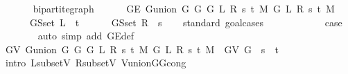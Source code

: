 \begin{isabellebody}
\ \ \isamarkupfalse%
\isanewline
\ \ \ \ {\isachardoublequoteopen}bipartite{\isacharunderscore}{\kern0pt}graph\isanewline
\ \ \ \ \ \ {\isacharparenleft}{\kern0pt}G{\isachardot}{\kern0pt}E\ {\isacharparenleft}{\kern0pt}G{\isachardot}{\kern0pt}union\ {\isacharparenleft}{\kern0pt}G{}\ G\ {\isacharparenleft}{\kern0pt}G{}\ L\ R\ s\ t\ M{\isacharparenright}{\kern0pt}{\isacharparenright}{\kern0pt}\ {\isacharparenleft}{\kern0pt}G{}\ L\ R\ s\ t\ M{\isacharparenright}{\kern0pt}{\isacharparenright}{\kern0pt}{\isacharparenright}{\kern0pt}\isanewline
\ \ \ \ \ \ {\isacharparenleft}{\kern0pt}G{\isachardot}{\kern0pt}S{\isachardot}{\kern0pt}set\ L\ {\isasymunion}\ {\isacharbraceleft}{\kern0pt}t{\isacharbraceright}{\kern0pt}{\isacharparenright}{\kern0pt}\isanewline
\ \ \ \ \ \ {\isacharparenleft}{\kern0pt}G{\isachardot}{\kern0pt}S{\isachardot}{\kern0pt}set\ R\ {\isasymunion}\ {\isacharbraceleft}{\kern0pt}s{\isacharbraceright}{\kern0pt}{\isacharparenright}{\kern0pt}{\isachardoublequoteclose}\isanewline
\ \ \isamarkupfalse%
\ {\isacharparenleft}{\kern0pt}standard{\isacharcomma}{\kern0pt}\ goal{\isacharunderscore}{\kern0pt}cases{\isacharparenright}{\kern0pt}\isanewline
\ \ \ \ \isamarkupfalse%
\ {}\isanewline
\ \ \ \ \isamarkupfalse%
\ {\isacharquery}{\kern0pt}case\isanewline
\ \ \ \ \ \ \isamarkupfalse%
\ {\isacharparenleft}{\kern0pt}auto\ simp\ add{\isacharcolon}{\kern0pt}\ G{\isachardot}{\kern0pt}E{\isacharunderscore}{\kern0pt}def{\isacharparenright}{\kern0pt}\isanewline
\ \ \isamarkupfalse%
\isanewline
\ \ \ \ \isamarkupfalse%
\ {}\isanewline
\ \ \ \ \isamarkupfalse%
\ {\isachardoublequoteopen}G{\isachardot}{\kern0pt}V\ {\isacharparenleft}{\kern0pt}G{\isachardot}{\kern0pt}union\ {\isacharparenleft}{\kern0pt}G{}\ G\ {\isacharparenleft}{\kern0pt}G{}\ L\ R\ s\ t\ M{\isacharparenright}{\kern0pt}{\isacharparenright}{\kern0pt}\ {\isacharparenleft}{\kern0pt}G{}\ L\ R\ s\ t\ M{\isacharparenright}{\kern0pt}{\isacharparenright}{\kern0pt}\ {\isacharequal}{\kern0pt}\ G{\isachardot}{\kern0pt}V\ G\ {\isasymunion}\ {\isacharbraceleft}{\kern0pt}s{\isacharbraceright}{\kern0pt}\ {\isasymunion}\ {\isacharbraceleft}{\kern0pt}t{\isacharbraceright}{\kern0pt}{\isachardoublequoteclose}\isanewline
\ \ \ \ \ \ \isamarkupfalse%
\ {\isacharparenleft}{\kern0pt}intro\ L{\isacharunderscore}{\kern0pt}subset{\isacharunderscore}{\kern0pt}V\ R{\isacharunderscore}{\kern0pt}subset{\isacharunderscore}{\kern0pt}V\ V{\isacharunderscore}{\kern0pt}union{\isacharunderscore}{\kern0pt}G{}{\isacharunderscore}{\kern0pt}G{}{\isacharunderscore}{\kern0pt}cong{\isacharparenright}{\kern0pt}\isanewline

\end{isabellebody}
